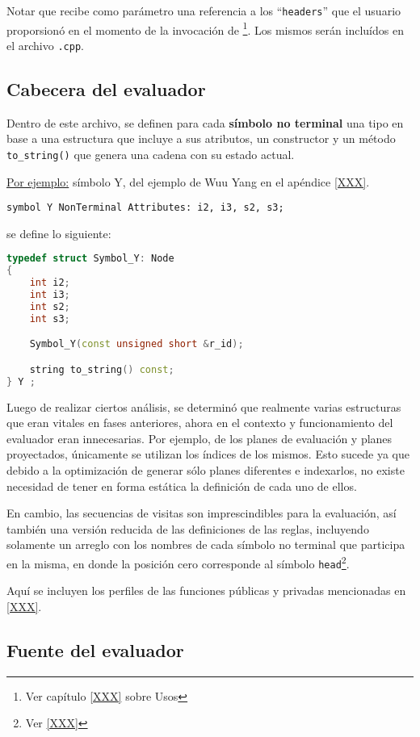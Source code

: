 Notar que recibe como parámetro una referencia a los ``\texttt{headers}'' que el usuario proporsionó en el momento de la invocación de \maggen \footnote{Ver capítulo \ref{XXX} sobre Usos}. Los mismos serán incluídos en el archivo \texttt{.cpp}.

\subsection{Cabecera del evaluador}

Dentro de este archivo, se definen para cada \textbf{símbolo no terminal} una tipo en base a una estructura que incluye a sus atributos, un constructor y un método \texttt{to\_string()} que genera una cadena con su estado actual.

\underline{Por ejemplo:} símbolo Y, del ejemplo de Wuu Yang en el apéndice \ref{XXX}.
\begin{center}\texttt{symbol Y  NonTerminal Attributes: i2, i3, s2, s3;}\end{center}
se define lo siguiente:
\begin{lstlisting}[language=C++, basicstyle=\scriptsize, columns=fullflexible, linewidth=7cm]
typedef struct Symbol_Y: Node
{
    int i2;
    int i3;
    int s2;
    int s3;

    Symbol_Y(const unsigned short &r_id);

    string to_string() const;
} Y ;
\end{lstlisting}

Luego de realizar ciertos análisis, se determinó que realmente varias estructuras que eran vitales en fases anteriores, ahora en el contexto y funcionamiento del evaluador eran innecesarias. Por ejemplo, de los planes de evaluación y planes proyectados, únicamente se utilizan los índices de los mismos. Esto sucede ya que debido a la optimización de generar sólo planes diferentes e indexarlos, no existe necesidad de tener en forma estática la definición de cada uno de ellos.

En cambio, las secuencias de visitas son imprescindibles para la evaluación, así también una versión reducida de las definiciones de las reglas, incluyendo solamente un arreglo con los nombres de cada símbolo no terminal que participa en la misma, en donde la posición cero corresponde al símbolo \texttt{head}\footnote{Ver \ref{XXX}}.

Aquí se incluyen los perfiles de las funciones públicas y privadas mencionadas en \ref{XXX}.

\subsection{Fuente del evaluador}

